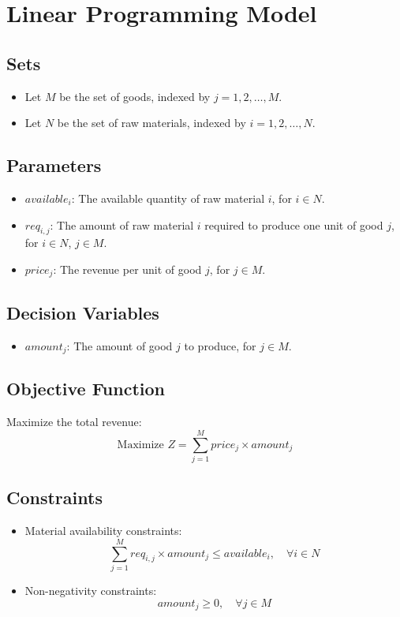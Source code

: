 \documentclass{article}
\begin{document}
\section*{Linear Programming Model}

\subsection*{Sets}
\begin{itemize}
    \item Let $M$ be the set of goods, indexed by $j = 1, 2, \ldots, M$.
    \item Let $N$ be the set of raw materials, indexed by $i = 1, 2, \ldots, N$.
\end{itemize}

\subsection*{Parameters}
\begin{itemize}
    \item $available_i$: The available quantity of raw material $i$, for $i \in N$.
    \item $req_{i,j}$: The amount of raw material $i$ required to produce one unit of good $j$, for $i \in N$, $j \in M$.
    \item $price_j$: The revenue per unit of good $j$, for $j \in M$.
\end{itemize}

\subsection*{Decision Variables}
\begin{itemize}
    \item $amount_j$: The amount of good $j$ to produce, for $j \in M$.
\end{itemize}

\subsection*{Objective Function}
Maximize the total revenue:
\[
\text{Maximize } Z = \sum_{j=1}^{M} price_j \times amount_j
\]

\subsection*{Constraints}
\begin{itemize}
    \item Material availability constraints:
    \[
    \sum_{j=1}^{M} req_{i,j} \times amount_j \leq available_i, \quad \forall i \in N
    \]
    \item Non-negativity constraints:
    \[
    amount_j \geq 0, \quad \forall j \in M
    \]
\end{itemize}
\end{document}
